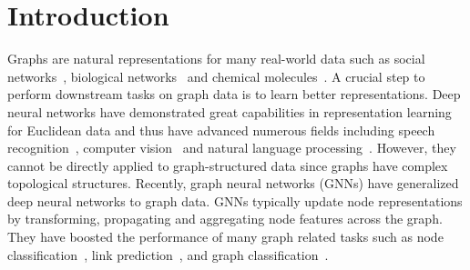 \documentclass[11pt,dvipdfm]{article}
\begin{document}
\section{Introduction}\label{sec:introduction}
Graphs are natural representations for many real-world data such as social networks~\cite{yanardag2015deep,hamilton2017inductive,kipf2016semi,velivckovic2017graph}, biological networks~\cite{borgwardt2005protein,shervashidze2011weisfeiler} and chemical molecules~\cite{gilmer2017neural,rong2020self}. A crucial step to perform downstream tasks on graph data is to learn better representations. Deep neural networks have demonstrated great capabilities in representation learning for Euclidean data and thus have advanced numerous fields including speech recognition~\cite{nassif2019speech}, computer vision~\cite{he2016deep} and natural language processing~\cite{devlin2018bert}. However, they cannot be directly applied to graph-structured data since graphs have complex topological structures. Recently, graph neural networks (GNNs) have generalized deep neural networks to graph data. GNNs typically update node representations by transforming, propagating and aggregating node features across the graph. They have boosted the performance of many graph related tasks such as node classification~\cite{kipf2016semi,hamilton2017inductive}, link prediction~\cite{zhang2018anrl,gao2019graph,vashishth2020compositionbased}, and graph classification~\cite{ying2018hierarchical,ma2019graph,li2020graph,gao2021topology}. 
\end{document}
